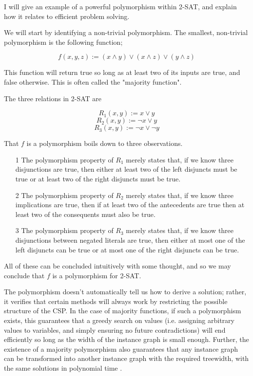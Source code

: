 I will give an example of a powerful polymorphism within 2-SAT, and explain how it relates to efficient problem solving.

We will start by identifying a non-trivial polymorphism. The smallest, non-trivial polymorphism is the following function;

\begin{equation}
    f(x, y, z) := (x \wedge y) \vee (x \wedge z) \vee (y \wedge z)
\end{equation}

This function will return true so long as at least two of its inputs are true, and false otherwise. This is often called the "majority function".

The three relations in 2-SAT are

\begin{equation}
    R_1(x, y) := x \vee y
\end{equation}
\begin{equation}
    R_2(x, y) := \neg x \vee y
\end{equation}
\begin{equation}
    R_3(x, y) := \neg x \vee \neg y
\end{equation}

That $f$ is a polymorphism boils down to three observations.

\begin{itemize}
    \item[1] The polymorphism property of $R_1$ merely states that, if we know three disjunctions are true, then either at least two of the left disjuncts must be true or at least two of the right disjuncts must be true.
    \item[2] The polymorphism property of $R_2$ merely states that, if we know three implications are true, then if at least two of the antecedents are true then at least two of the consequents must also be true.
    \item[3] The polymorphism property of $R_3$ merely states that, if we know three disjunctions between negated literals are true, then either at most one of the left disjuncts can be true or at most one of the right disjuncts can be true.
\end{itemize}

All of these can be concluded intuitively with some thought, and so we may conclude that $f$ is a polymorphism for 2-SAT.

The polymorphism doesn't automatically tell us how to derive a solution; rather, it verifies that certain methods will always work by restricting the possible structure of the CSP. In the case of majority functions, if such a polymorphism exists, this guarantees that a greedy search on values (i.e. assigning arbitrary values to variables, and simply ensuring no future contradictions) will end efficiently so long as the width of the instance graph is small enough. Further, the existence of a majority polymorphism also guarantees that any instance graph can be transformed into another instance graph with the required treewidth, with the same solutions in polynomial time \citep{feder1998computational}.

